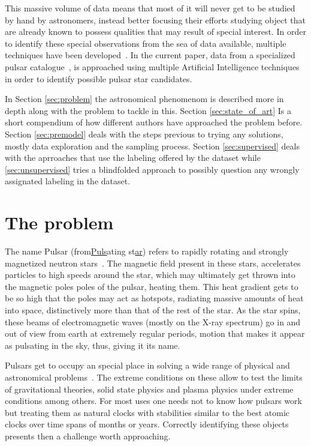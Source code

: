 \documentclass[journal]{IEEEtran}
\begin{document}
This massive volume of data means that most of it will never get to be studied
by hand by astronomers, instead better focusing their efforts studying object
that are already known to possess qualities that may result of special interest.
In order to identify these special observations from the sea of data available,
multiple techniques have been developed~\cite{pulsar:dataset:explanation:lyon}.
In the current paper, data from a specialized pulsar
catalogue~\cite{pulsar:dataset:lyon}, is approached using multiple Artificial
Intelligence techniques in order to identify possible pulsar star candidates.

In Section \ref{sec:problem} the astronomical phenomenom is described more in
 depth along with the problem to tackle in this. Section \ref{sec:state_of_art}
 Is a short compendium of how different authors have approached the problem
 before. Section \ref{sec:premodel} deals with the steps previous to trying any
 solutions, mostly data exploration and the sampling process. Section
 \ref{sec:supervised} deals with the aprroaches that use the labeling offered
 by the dataset while \ref{sec:unsupervised} tries a blindfolded approach to
 possibly question any wrongly assignated labeling in the dataset.

\section{The problem\label{sec:problem}}

The name Pulsar (from\underline{Puls}ating st\underline{ar}) refers to rapidly
rotating and strongly magnetized neutron stars~\cite{pulsar:definition:nasa}.
The magnetic field present in these stars, accelerates particles to high speeds
around the star, which may ultimately get thrown into the magnetic poles poles
of the pulsar, heating them. This heat gradient gets to be so high that the
poles may act as hotspots, radiating massive amounts of heat into space,
distinctively more than that of the rest of the star. As the star spins, these
beams of electromagnetic waves (mostly on the X-ray spectrum) go in and out of
view from earth at extremely regular periods, motion that makes it appear as
pulsating in the sky, thus, giving it its name.

Pulsars get to occupy an special place in solving a wide range of physical and
astronomical problems~\cite{pulsar:importance:kramer}. The extreme conditions on
these allow to test the limits of gravitational theories, solid state physics
and plasma physics under extreme conditions among others. For most uses one
needs not to know how pulsars work but treating them as natural clocks with
stabilities similar to the best atomic clocks over time spans of months or
years. Correctly identifying these objects presents then a challenge worth
approaching.
\end{document}

